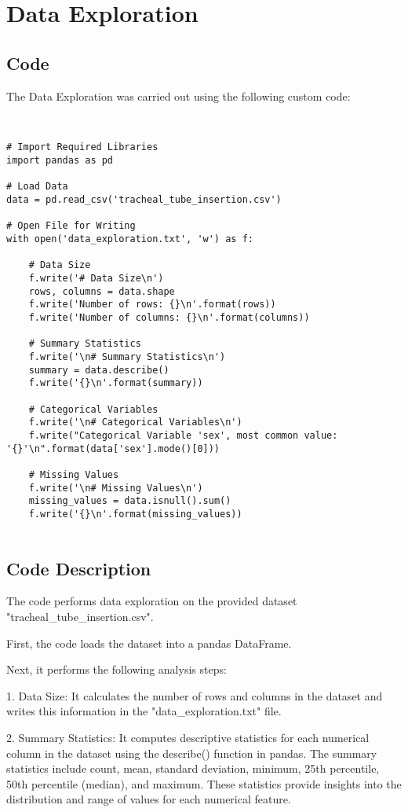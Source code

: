\documentclass[11pt]{article}
\begin{document}
\section{Data Exploration}
\subsection{{Code}}
The Data Exploration was carried out using the following custom code:

\begin{verbatim}


# Import Required Libraries
import pandas as pd

# Load Data
data = pd.read_csv('tracheal_tube_insertion.csv')

# Open File for Writing
with open('data_exploration.txt', 'w') as f:

    # Data Size
    f.write('# Data Size\n')
    rows, columns = data.shape
    f.write('Number of rows: {}\n'.format(rows))
    f.write('Number of columns: {}\n'.format(columns))

    # Summary Statistics
    f.write('\n# Summary Statistics\n')
    summary = data.describe()
    f.write('{}\n'.format(summary))

    # Categorical Variables
    f.write('\n# Categorical Variables\n')
    f.write("Categorical Variable 'sex', most common value: '{}'\n".format(data['sex'].mode()[0]))

    # Missing Values
    f.write('\n# Missing Values\n')
    missing_values = data.isnull().sum()
    f.write('{}\n'.format(missing_values))


\end{verbatim}

\subsection{Code Description}

The code performs data exploration on the provided dataset "tracheal\_tube\_insertion.csv". 

First, the code loads the dataset into a pandas DataFrame. 

Next, it performs the following analysis steps:

1. Data Size: It calculates the number of rows and columns in the dataset and writes this information in the "data\_exploration.txt" file.

2. Summary Statistics: It computes descriptive statistics for each numerical column in the dataset using the describe() function in pandas. The summary statistics include count, mean, standard deviation, minimum, 25th percentile, 50th percentile (median), and maximum. These statistics provide insights into the distribution and range of values for each numerical feature.
\end{document}
